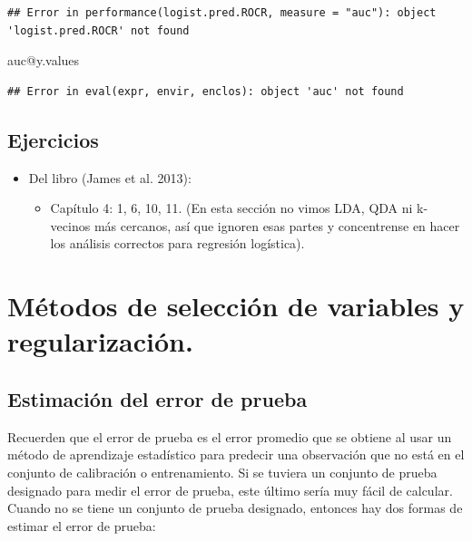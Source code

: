 \documentclass[
  12pt,
]{book}
\newenvironment{Shaded}{\begin{snugshade}}{\end{snugshade}}
\newcommand{\NormalTok}[1]{#1}
\newcommand{\SpecialCharTok}[1]{\textcolor[rgb]{0.00,0.00,0.00}{#1}}
\providecommand{\tightlist}{%
  \setlength{\itemsep}{0pt}\setlength{\parskip}{0pt}}
\begin{document}
\begin{verbatim}
## Error in performance(logist.pred.ROCR, measure = "auc"): object 'logist.pred.ROCR' not found
\end{verbatim}

\begin{Shaded}
\begin{Highlighting}[]
\NormalTok{auc}\SpecialCharTok{@}\NormalTok{y.values}
\end{Highlighting}
\end{Shaded}

\begin{verbatim}
## Error in eval(expr, envir, enclos): object 'auc' not found
\end{verbatim}

\hypertarget{ejercicios-3}{%
\section{Ejercicios}\label{ejercicios-3}}

\begin{itemize}
\tightlist
\item
  Del libro (James et al. 2013):

  \begin{itemize}
  \tightlist
  \item
    Capítulo 4: 1, 6, 10, 11. (En esta sección no vimos LDA, QDA ni
    k-vecinos más cercanos, así que ignoren esas partes y concentrense
    en hacer los análisis correctos para regresión logística).
  \end{itemize}
\end{itemize}

\hypertarget{muxe9todos-de-selecciuxf3n-de-variables-y-regularizaciuxf3n.}{%
\chapter{Métodos de selección de variables y
regularización.}\label{muxe9todos-de-selecciuxf3n-de-variables-y-regularizaciuxf3n.}}

\hypertarget{estimaciuxf3n-del-error-de-prueba}{%
\section{Estimación del error de
prueba}\label{estimaciuxf3n-del-error-de-prueba}}

Recuerden que el error de prueba es el error promedio que se obtiene al
usar un método de aprendizaje estadístico para predecir una observación
que no está en el conjunto de calibración o entrenamiento. Si se tuviera
un conjunto de prueba designado para medir el error de prueba, este
último sería muy fácil de calcular. Cuando no se tiene un conjunto de
prueba designado, entonces hay dos formas de estimar el error de prueba:
\end{document}
